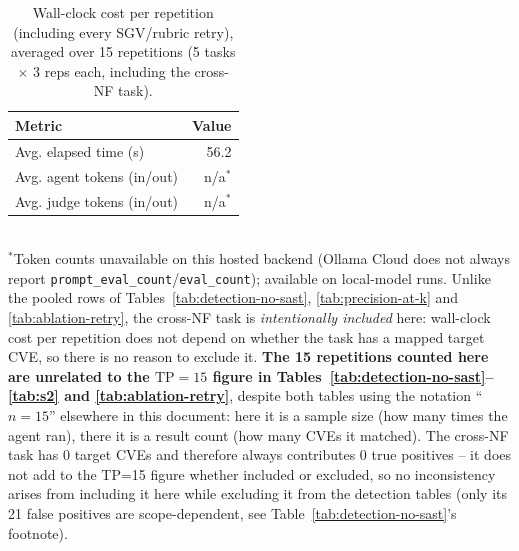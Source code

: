 \begin{table}[t]
\centering
\caption{Wall-clock cost per repetition (including every SGV/rubric retry), averaged over 15 repetitions (5 tasks $\times$ 3 reps each, including the cross-NF task).}
\label{tab:cost}
\begin{tabular}{lr}
\toprule
Metric & Value \\
\midrule
Avg. elapsed time (s) & 56.2 \\
Avg. agent tokens (in/out) & n/a$^{*}$ \\
Avg. judge tokens (in/out) & n/a$^{*}$ \\
\bottomrule
\end{tabular}
\\[2pt]
\footnotesize{$^{*}$Token counts unavailable on this hosted backend (Ollama Cloud does not always report \texttt{prompt\_eval\_count}/\texttt{eval\_count}); available on local-model runs. Unlike the pooled rows of Tables~\ref{tab:detection-no-sast}, \ref{tab:precision-at-k} and \ref{tab:ablation-retry}, the cross-NF task is \emph{intentionally included} here: wall-clock cost per repetition does not depend on whether the task has a mapped target CVE, so there is no reason to exclude it. \textbf{The 15 repetitions counted here are unrelated to the $\mathrm{TP}=15$ figure in Tables~\ref{tab:detection-no-sast}--\ref{tab:s2} and \ref{tab:ablation-retry}}, despite both tables using the notation ``$n{=}15$'' elsewhere in this document: here it is a sample size (how many times the agent ran), there it is a result count (how many CVEs it matched). The cross-NF task has 0 target CVEs and therefore always contributes 0 true positives -- it does not add to the TP=15 figure whether included or excluded, so no inconsistency arises from including it here while excluding it from the detection tables (only its 21 false positives are scope-dependent, see Table~\ref{tab:detection-no-sast}'s footnote).}
\end{table}

